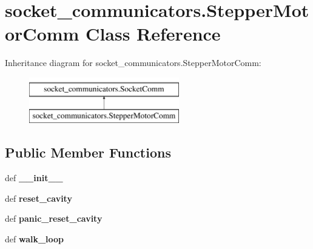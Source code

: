 \hypertarget{classsocket__communicators_1_1_stepper_motor_comm}{\section{socket\-\_\-communicators.\-Stepper\-Motor\-Comm Class Reference}
\label{classsocket__communicators_1_1_stepper_motor_comm}
}
Inheritance diagram for socket\-\_\-communicators.\-Stepper\-Motor\-Comm\-:\begin{figure}[H]
\begin{center}
\leavevmode
\includegraphics[height=2.000000cm]{classsocket__communicators_1_1_stepper_motor_comm}
\end{center}
\end{figure}
\subsection*{Public Member Functions}
\begin{DoxyCompactItemize}
\item 
\hypertarget{classsocket__communicators_1_1_stepper_motor_comm_ac01add7476590cc06228220173f1c6f8}{def {\bfseries \-\_\-\-\_\-init\-\_\-\-\_\-}}\label{classsocket__communicators_1_1_stepper_motor_comm_ac01add7476590cc06228220173f1c6f8}

\item 
\hypertarget{classsocket__communicators_1_1_stepper_motor_comm_a4a04ef11f6ffbf46d7a387f5ade5050f}{def {\bfseries reset\-\_\-cavity}}\label{classsocket__communicators_1_1_stepper_motor_comm_a4a04ef11f6ffbf46d7a387f5ade5050f}

\item 
\hypertarget{classsocket__communicators_1_1_stepper_motor_comm_ae81cd91ab5cb2e28dae486e6fc0301c6}{def {\bfseries panic\-\_\-reset\-\_\-cavity}}\label{classsocket__communicators_1_1_stepper_motor_comm_ae81cd91ab5cb2e28dae486e6fc0301c6}

\item 
\hypertarget{classsocket__communicators_1_1_stepper_motor_comm_ae1e0103a761a1907994f55a7663ce84a}{def {\bfseries walk\-\_\-loop}}\label{classsocket__communicators_1_1_stepper_motor_comm_ae1e0103a761a1907994f55a7663ce84a}

\end{DoxyCompactItemize}
